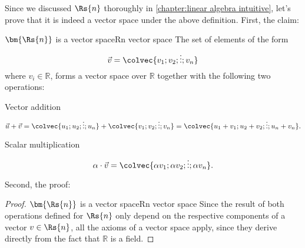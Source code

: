 Since we discussed $\Rs{n}$ thoroughly in \autoref{chapter:linear algebra intuitive}, let's prove that it is indeed a vector space under the above definition. First, the claim:

\begin{theorem}{$\bm{\Rs{n}}$ is a vector space}{Rn vector space}
	The set of elements of the form
	\[
		\vec{v} = \colvec{v_{1};v_{2};\vdots;v_{n}}
	\]
	where $v_{i}\in\mathbb{R}$, forms a vector space over $\mathbb{R}$ together with the following two operations:
	\begin{descitemize}
		\item[Vector addition]
			\[
				\vec{u}+\vec{v} = \colvec{u_{1};u_{2};\vdots;u_{n}} + \colvec{v_{1};v_{2};\vdots;v_{n}} = \colvec{u_{1}+v_{1};u_{2}+v_{2};\vdots;u_{n}+v_{n}}.
			\]
		\item[Scalar multiplication]
			\[
				\alpha\cdot\vec{v} = \colvec{\alpha v_{1};\alpha v_{2};\vdots;\alpha v_{n}}.
			\]
	\end{descitemize}
\end{theorem}

Second, the proof:

\begin{proof}{$\bm{\Rs{n}}$ is a vector space}{Rn vector space}
	Since the result of both operations defined for $\Rs{n}$ only depend on the respective components of a vector $v\in\Rs{n}$, all the axioms of a vector space apply, since they derive directly from the fact that $\mathbb{R}$ is a field.
\end{proof}

